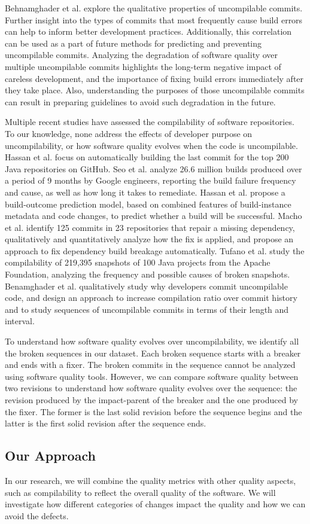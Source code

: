 Behnamghader et al. \cite{pooyan_qrs} explore the qualitative properties of uncompilable commits.
Further insight into the types of commits that most frequently cause build errors can help to inform better development practices. Additionally, this correlation can be used as a part of future methods for predicting and preventing uncompilable commits. 
Analyzing the degradation of software quality over multiple uncompilable commits highlights the long-term negative impact of careless development, and the importance of fixing build errors immediately after they take place.
Also, understanding the purposes of those uncompilable commits can result in preparing guidelines to avoid such degradation in the future.

Multiple recent studies \cite{8170083,Seo:2014:PBE:2568225.2568255,Hassan2017ESEM,macho2018automatically,SMR:SMR1838, pooyan_esem, pooyan_qrs} have assessed the compilability of software repositories. 
To our knowledge, none address the effects of developer purpose on uncompilability, or how software quality evolves when the code is uncompilable. 
Hassan et al. \cite{8170083} focus on automatically building the last commit for the top 200 Java repositories on GitHub.
Seo et al. \cite{Seo:2014:PBE:2568225.2568255} analyze 26.6 million builds produced over a period of 9 months by Google engineers, reporting the build failure frequency and cause, as well as how long it takes to remediate.
Hassan et al. \cite{Hassan2017ESEM} propose a build-outcome prediction model, based on combined features of build-instance metadata and code changes, to predict whether a build will be successful.
Macho et al. \cite{macho2018automatically} identify 125 commits in 23 repositories that repair a missing dependency, qualitatively and quantitatively analyze how the fix is applied, and propose an approach to fix dependency build breakage automatically.
Tufano et al. \cite{SMR:SMR1838} study the compilability of 219,395 snapshots of 100 Java projects from the Apache Foundation, analyzing the frequency and possible causes of broken snapshots.
Benamghader et al. \cite{pooyan_qrs} qualitatively study why developers commit uncompilable code, and design an approach \cite{pooyan_esem} to increase compilation ratio over commit history and to study sequences of uncompilable commits in terms of their length and interval.

To understand how software quality evolves over uncompilability, we identify all the broken sequences in our dataset.
Each broken sequence starts with a breaker and ends with a fixer. The broken commits in the sequence cannot be analyzed using software quality tools. 
However, we can compare software quality between two revisions to understand how software quality evolves over the sequence: the revision produced by the impact-parent of the breaker and the one produced by the fixer.
The former is the last solid revision before the sequence begins and the latter is the first solid revision after the sequence ends. 

\subsection{Our Approach}

In our research, we will combine the quality metrics with other quality aspects, such as compilability to reflect the overall quality of the software.
We will investigate how different categories of changes impact the quality and how we can avoid the defects.
